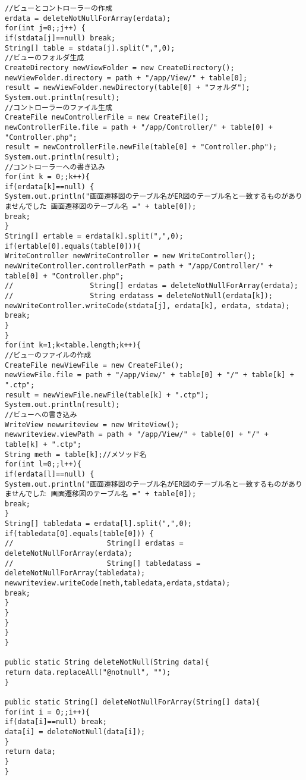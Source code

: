 \documentclass{funthesis}
\begin{document}
\begin{lstlisting}[caption=CreateCode.java,label=1]
//ビューとコントローラーの作成
erdata = deleteNotNullForArray(erdata);
for(int j=0;;j++) {
if(stdata[j]==null) break;
String[] table = stdata[j].split(",",0);
//ビューのフォルダ生成
CreateDirectory newViewFolder = new CreateDirectory();
newViewFolder.directory = path + "/app/View/" + table[0];
result = newViewFolder.newDirectory(table[0] + "フォルダ");
System.out.println(result);
//コントローラーのファイル生成
CreateFile newControllerFile = new CreateFile();
newControllerFile.file = path + "/app/Controller/" + table[0] + "Controller.php";
result = newControllerFile.newFile(table[0] + "Controller.php");
System.out.println(result);	
//コントローラーへの書き込み
for(int k = 0;;k++){
if(erdata[k]==null) {
System.out.println("画面遷移図のテーブル名がER図のテーブル名と一致するものがありませんでした 画面遷移図のテーブル名 =" + table[0]);
break;
}
String[] ertable = erdata[k].split(",",0);
if(ertable[0].equals(table[0])){
WriteController newWriteController = new WriteController();
newWriteController.controllerPath = path + "/app/Controller/" + table[0] + "Controller.php";
//					String[] erdatas = deleteNotNullForArray(erdata);
//					String erdatass = deleteNotNull(erdata[k]);
newWriteController.writeCode(stdata[j], erdata[k], erdata, stdata);
break;
}
}
for(int k=1;k<table.length;k++){
//ビューのファイルの作成
CreateFile newViewFile = new CreateFile();
newViewFile.file = path + "/app/View/" + table[0] + "/" + table[k] + ".ctp";
result = newViewFile.newFile(table[k] + ".ctp");
System.out.println(result);
//ビューへの書き込み
WriteView newwriteview = new WriteView();
newwriteview.viewPath = path + "/app/View/" + table[0] + "/" + table[k] + ".ctp";
String meth = table[k];//メソッド名
for(int l=0;;l++){
if(erdata[l]==null) {
System.out.println("画面遷移図のテーブル名がER図のテーブル名と一致するものがありませんでした 画面遷移図のテーブル名 =" + table[0]);
break;
}
String[] tabledata = erdata[l].split(",",0);
if(tabledata[0].equals(table[0])) {
//						String[] erdatas = deleteNotNullForArray(erdata);
//						String[] tabledatass = deleteNotNullForArray(tabledata);
newwriteview.writeCode(meth,tabledata,erdata,stdata);
break;
}
}
}
}
}

public static String deleteNotNull(String data){
return data.replaceAll("@notnull", "");
}

public static String[] deleteNotNullForArray(String[] data){
for(int i = 0;;i++){
if(data[i]==null) break;
data[i] = deleteNotNull(data[i]);
}
return data;
}
}
\end{lstlisting}　
\end{document}
